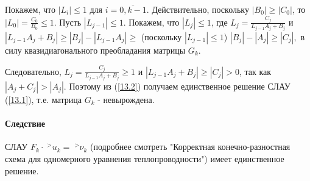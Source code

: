\documentclass[__main__.tex]{subfiles}
\begin{document}
Покажем, что $|L_i| \leq 1$ для $i = \overline{0,k-1}$. Действительно, поскольку $|B_0|\geq|C_0|$, то $|L_0| = $$\frac{C_0}{B_0}$$ \leq 1$. Пусть $|L_{j-1}| \leq 1$. Покажем, что  $|L_{j}| \leq 1$, где $L_j = $$\frac{C_{j}}{L_{j-1}A_j + B_j}$ и $|L_{j-1}A_j + B_j|  \geq |B_j| - |L_{j-1}A_j| \geq$ (поскольку $|L_{j-1}| \leq 1$) $ |B_j|-|A_j| \geq |C_j|,$ в силу квазидиагонального преобладания матрицы $ G_k$.

Следовательно, $L_j = \frac{C_{j}}{L_{j-1}A_j + B_j} \geq 1$ и $|L_{j-1}A_j + B_j| \geq |C_j| > 0$, так как $|A_j + C_j|  > |A_j|$. Поэтому из (\ref{13.2}) получаем единственное решение СЛАУ (\ref{13.1}), т.е. матрица $G_k$ - невырождена.

\paragraph{Следствие}

СЛАУ $F_k \cdot \;^{>}u_k = \;^{>}\nu_k$ (подробнее смотреть "Корректная конечно-разностная схема для одномерного уравнения теплопроводности") имеет единственное решение.
\end{document}
